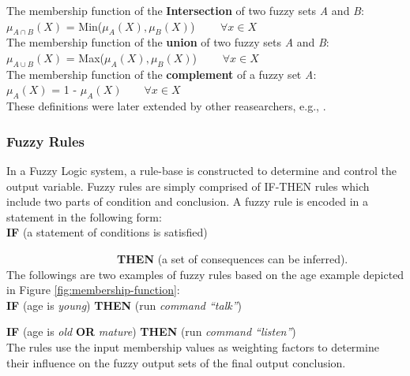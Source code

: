 \documentclass[11pt]{article}
\begin{document}
\noindent The membership function of the \textbf{Intersection} of two fuzzy
sets \textit{A} and \textit{B}:\\

$\mu_{A \cap B}(X)$ = Min($\mu_{A}(X), \mu_{B}(X)$) $\qquad \forall x \in X$\\

\noindent The membership function of the \textbf{union} of two fuzzy sets
\textit{A} and \textit{B}:\\

$\mu_{A \cup B}(X)$ = Max($\mu_{A}(X), \mu_{B}(X)$) $\qquad \forall x \in X$\\

\noindent The membership function of the \textbf{complement} of a fuzzy set
\textit{A}:\\

$\mu_{A}(X)$ = 1 - $\mu_{A}(X) \qquad \forall x \in X$\\

\noindent These definitions were later extended by other reasearchers, e.g.,
\cite{yager:generalizing-leximin}.

\subsubsection{Fuzzy Rules}
\label{sec:fuzzy-rules}

In a Fuzzy Logic system, a rule-base is constructed to determine and control the
output variable. Fuzzy rules are simply comprised of IF-THEN rules which include
two parts of condition and conclusion. A fuzzy rule is encoded in a statement in
the following form:\\

\noindent \textbf{IF} (a statement of conditions is satisfied)

$\qquad\qquad\qquad\qquad\qquad$\textbf{THEN} (a set of consequences can
be inferred).\\

The followings are two examples of fuzzy
rules based on the age example depicted in Figure
\ref{fig:membership-function}:\\

\textbf{IF} (age is \textit{young}) \textbf{THEN} (run \textit{command
``talk''})
 
\textbf{IF} (age is \textit{old} \textbf{OR} \textit{mature}) \textbf{THEN} (run
\textit{command ``listen''})\\

\noindent The rules use the input membership values as weighting factors to
determine their influence on the fuzzy output sets of the final output
conclusion.
\end{document}
